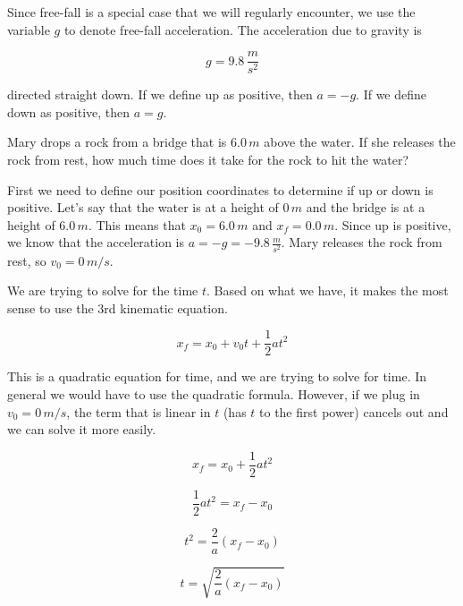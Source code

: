 \documentclass[12pt]{book}
\begin{document}
Since free-fall is a special case that we will regularly encounter, we use the variable $g$ to denote free-fall acceleration. The acceleration due to gravity is 

\begin{equation}
g = 9.8 \, \frac{m}{s^2}
\end{equation}

directed straight down. If we define up as positive, then $a = -g$. If we define down as positive, then $a = g$.

\linespace

\example

Mary drops a rock from a bridge that is $6.0 \, m$ above the water. If she releases the rock from rest, how much time does it take for the rock to hit the water?

\hspace{10pt}

First we need to define our position coordinates to determine if up or down is positive. Let's say that the water is at a height of $0 \, m$ and the bridge is at a height of $6.0 \, m$. This means that $x_0 = 6.0 \, m$ and $x_f = 0.0 \, m$. Since up is positive, we know that the acceleration is $a = -g = -9.8 \, \frac{m}{s^2}$. Mary releases the rock from rest, so $v_0 = 0 \, m/s$.

We are trying to solve for the time $t$. Based on what we have, it makes the most sense to use the 3rd kinematic equation.

\begin{equation}
x_f = x_0 + v_0 t + \frac{1}{2} a t^2
\end{equation}

This is a quadratic equation for time, and we are trying to solve for time. In general we would have to use the quadratic formula. However, if we plug in $v_0 = 0 \, m/s$, the term that is linear in $t$ (has $t$ to the first power) cancels out and we can solve it more easily.

\begin{equation}
x_f = x_0 + \frac{1}{2} a t^2
\end{equation}

\begin{equation}
\frac{1}{2} a t^2 = x_f - x_0
\end{equation}

\begin{equation}
t^2 = \frac{2}{a} (x_f - x_0)
\end{equation}

\begin{equation}
t = \sqrt{\frac{2}{a} (x_f - x_0)}
\end{equation}
\end{document}
